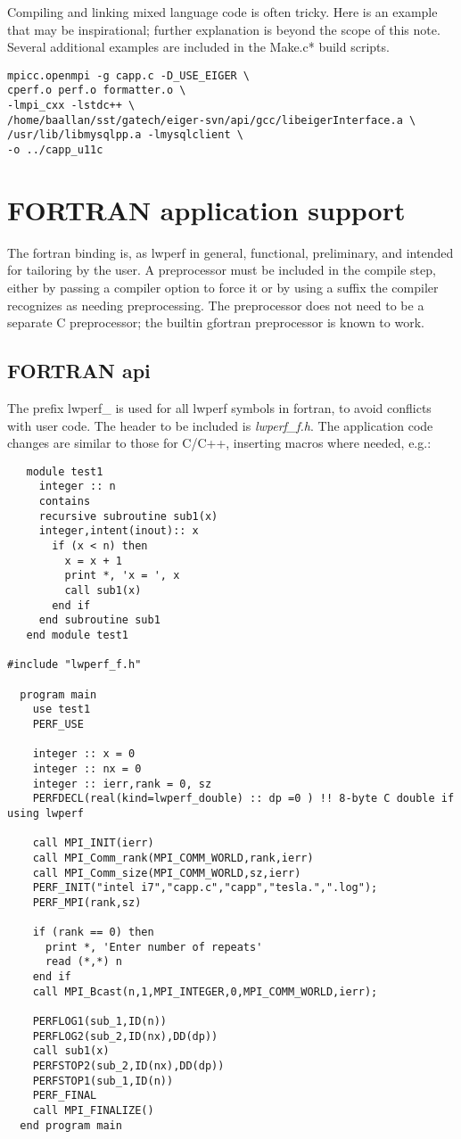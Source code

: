 \documentclass{article}
\begin{document}
Compiling and linking mixed language code is often tricky. Here is an example that may be inspirational; further explanation is beyond the scope of this note. Several additional examples are included in the Make.c* build scripts.
\begin{verbatim}
mpicc.openmpi -g capp.c -D_USE_EIGER \
cperf.o perf.o formatter.o \
-lmpi_cxx -lstdc++ \
/home/baallan/sst/gatech/eiger-svn/api/gcc/libeigerInterface.a \
/usr/lib/libmysqlpp.a -lmysqlclient \
-o ../capp_u11c
\end{verbatim}

\section{FORTRAN application support}
\label{sec:fortran}
The fortran binding is, as lwperf in general, functional, preliminary, and intended for tailoring by the user.  A preprocessor must be included in the compile step, either by passing a compiler option to force it or by using a suffix the compiler recognizes as needing preprocessing. The preprocessor does not need to be a separate C preprocessor; the builtin gfortran preprocessor is known to work.

\subsection{FORTRAN api}
\label{sec:fapi}
The prefix lwperf\_ is used for all lwperf symbols in fortran, to avoid conflicts with user code. The header to be included is {\em lwperf\_f.h}. 
The application code changes are similar to those for C/C++, inserting macros where needed, e.g.:
\begin{verbatim}
   module test1
     integer :: n
     contains
     recursive subroutine sub1(x)
     integer,intent(inout):: x
       if (x < n) then
         x = x + 1
         print *, 'x = ', x
         call sub1(x)
       end if
     end subroutine sub1
   end module test1

#include "lwperf_f.h"

  program main
    use test1
    PERF_USE

    integer :: x = 0
    integer :: nx = 0
    integer :: ierr,rank = 0, sz
    PERFDECL(real(kind=lwperf_double) :: dp =0 ) !! 8-byte C double if using lwperf

    call MPI_INIT(ierr)
    call MPI_Comm_rank(MPI_COMM_WORLD,rank,ierr)
    call MPI_Comm_size(MPI_COMM_WORLD,sz,ierr)
    PERF_INIT("intel i7","capp.c","capp","tesla.",".log");
    PERF_MPI(rank,sz)

    if (rank == 0) then
      print *, 'Enter number of repeats'
      read (*,*) n
    end if
    call MPI_Bcast(n,1,MPI_INTEGER,0,MPI_COMM_WORLD,ierr);

    PERFLOG1(sub_1,ID(n)) 
    PERFLOG2(sub_2,ID(nx),DD(dp))
    call sub1(x)
    PERFSTOP2(sub_2,ID(nx),DD(dp))
    PERFSTOP1(sub_1,ID(n))
    PERF_FINAL
    call MPI_FINALIZE()
  end program main
\end{verbatim}
\end{document}
